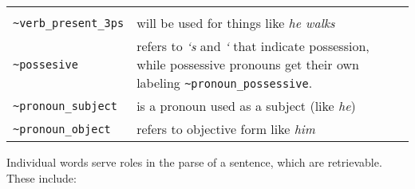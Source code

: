 \documentclass[]{article}
\begin{document}
\begin{longtable}[]{@{}ll@{}}
\begin{minipage}[t]{0.20\columnwidth}
\end{minipage}\tabularnewline
\begin{minipage}[t]{0.30\columnwidth}\raggedright\strut
\texttt{\textasciitilde{}verb\_present\_3ps}\strut
\end{minipage} & \begin{minipage}[t]{0.20\columnwidth}\raggedright\strut
will be used for things like \emph{he walks}\strut
\end{minipage}\tabularnewline
\begin{minipage}[t]{0.30\columnwidth}\raggedright\strut
\texttt{\textasciitilde{}possesive}\strut
\end{minipage} & \begin{minipage}[t]{0.20\columnwidth}\raggedright\strut
refers to \emph{`s} and \emph{`} that indicate possession, while
possessive pronouns get their own labeling
\texttt{\textasciitilde{}pronoun\_possessive}.\strut
\end{minipage}\tabularnewline
\begin{minipage}[t]{0.30\columnwidth}\raggedright\strut
\texttt{\textasciitilde{}pronoun\_subject}\strut
\end{minipage} & \begin{minipage}[t]{0.20\columnwidth}\raggedright\strut
is a pronoun used as a subject (like \emph{he})\strut
\end{minipage}\tabularnewline
\begin{minipage}[t]{0.30\columnwidth}\raggedright\strut
\texttt{\textasciitilde{}pronoun\_object}\strut
\end{minipage} & \begin{minipage}[t]{0.20\columnwidth}\raggedright\strut
refers to objective form like \emph{him}\strut
\end{minipage}\tabularnewline
\bottomrule
\end{longtable}

Individual words serve roles in the parse of a sentence, which are
retrievable. These include:
\end{document}
